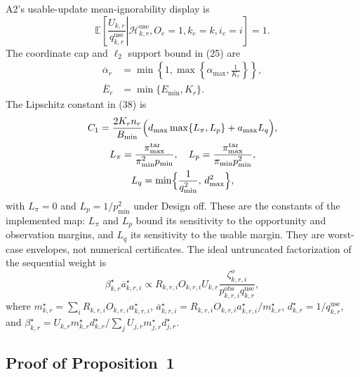 A2's usable-update mean-ignorability display is
\begin{equation}
 \mathbb{E}\!\left[
 \left.
 \frac{U_{k,r}}{q^{\mathrm{use}}_{k,r}}
 \right|
 \mathcal{H}^{\mathrm{use}}_{k,r},
 O_e=1,k_e=k,i_e=i
 \right]
 =1.
 \label{eq:A2_use_mean_ignorability}
\end{equation}
The coordinate cap and $\ell_2$ support bound in (25) are
\begin{equation}
\begin{aligned}
 \overline\alpha_r
 &=
 \min\!\left\{
 1,
 \max\!\left\{
 \alpha_{\max},
 \frac{1}{K_r}
 \right\}
 \right\},\\
 \overline E_r
 &=
 \min\{E_{\min},K_r\}.
\end{aligned}
 \label{eq:cap_ess}
\end{equation}
The Lipschitz constant in (38) is
\begin{multline}
C_1
=
\frac{2K_r n_r}{B_{\min}}
\Bigl(
d_{\max}\max\{L_\pi,L_p\}+a_{\max}L_q
\Bigr),\\
L_\pi=\frac{\pi^{\mathrm{tar}}_{\max}}{\pi_{\min}^2 p_{\min}},\quad
L_p=\frac{\pi^{\mathrm{tar}}_{\max}}{\pi_{\min}p_{\min}^2},\\
L_q=\min\Bigl\{\frac{1}{q_{\min}^2},\,d_{\max}^2\Bigr\},
\label{eq:g4_c1}
\end{multline}
with $L_\pi=0$ and $L_p=1/p_{\min}^2$ under Design off.  These are the
constants of the implemented map: $L_\pi$ and $L_p$ bound its sensitivity to
the opportunity and observation margins, and $L_q$ its sensitivity to the
usable margin.  They are worst-case envelopes, not numerical certificates.
The ideal untruncated factorization of the sequential weight is
\begin{equation}
 \beta^\star_{k,r}\overline a^\star_{k,r,i}
 \propto
 R_{k,r,i}O_{k,r,i}U_{k,r}
 \frac{\zeta^{o}_{k,r,i}}
 {p^{\mathrm{obs}}_{k,r,i}q^{\mathrm{use}}_{k,r}},
 \label{eq:factorized_global_weight}
\end{equation}
where
$m^\star_{k,r}=\sum_i R_{k,r,i}O_{k,r,i}a^\star_{k,r,i}$,
$\overline a^\star_{k,r,i}=R_{k,r,i}O_{k,r,i}a^\star_{k,r,i}/m^\star_{k,r}$,
$d^\star_{k,r}=1/q^{\mathrm{use}}_{k,r}$, and
$\beta^\star_{k,r}=U_{k,r}m^\star_{k,r}d^\star_{k,r}/
\sum_j U_{j,r}m^\star_{j,r}d^\star_{j,r}$.

\subsection{Proof of Proposition~1}
\label{app:proof_prop1}


